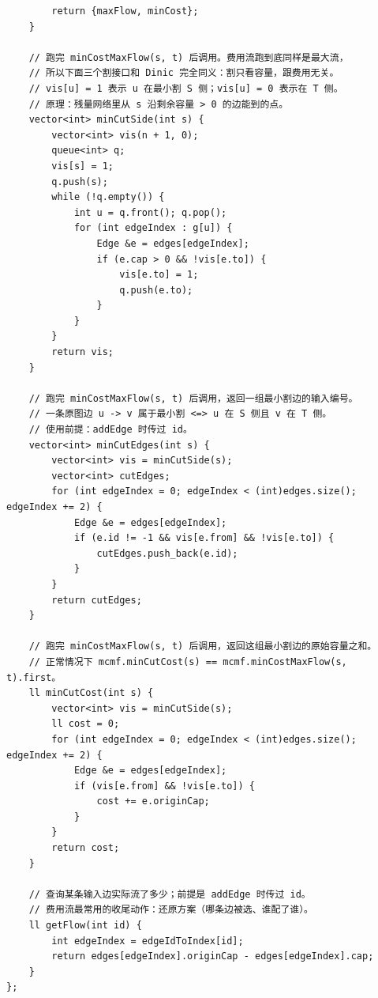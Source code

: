 \begin{verbatim}
        return {maxFlow, minCost};
    }

    // 跑完 minCostMaxFlow(s, t) 后调用。费用流跑到底同样是最大流，
    // 所以下面三个割接口和 Dinic 完全同义：割只看容量，跟费用无关。
    // vis[u] = 1 表示 u 在最小割 S 侧；vis[u] = 0 表示在 T 侧。
    // 原理：残量网络里从 s 沿剩余容量 > 0 的边能到的点。
    vector<int> minCutSide(int s) {
        vector<int> vis(n + 1, 0);
        queue<int> q;
        vis[s] = 1;
        q.push(s);
        while (!q.empty()) {
            int u = q.front(); q.pop();
            for (int edgeIndex : g[u]) {
                Edge &e = edges[edgeIndex];
                if (e.cap > 0 && !vis[e.to]) {
                    vis[e.to] = 1;
                    q.push(e.to);
                }
            }
        }
        return vis;
    }

    // 跑完 minCostMaxFlow(s, t) 后调用，返回一组最小割边的输入编号。
    // 一条原图边 u -> v 属于最小割 <=> u 在 S 侧且 v 在 T 侧。
    // 使用前提：addEdge 时传过 id。
    vector<int> minCutEdges(int s) {
        vector<int> vis = minCutSide(s);
        vector<int> cutEdges;
        for (int edgeIndex = 0; edgeIndex < (int)edges.size(); edgeIndex += 2) {
            Edge &e = edges[edgeIndex];
            if (e.id != -1 && vis[e.from] && !vis[e.to]) {
                cutEdges.push_back(e.id);
            }
        }
        return cutEdges;
    }

    // 跑完 minCostMaxFlow(s, t) 后调用，返回这组最小割边的原始容量之和。
    // 正常情况下 mcmf.minCutCost(s) == mcmf.minCostMaxFlow(s, t).first。
    ll minCutCost(int s) {
        vector<int> vis = minCutSide(s);
        ll cost = 0;
        for (int edgeIndex = 0; edgeIndex < (int)edges.size(); edgeIndex += 2) {
            Edge &e = edges[edgeIndex];
            if (vis[e.from] && !vis[e.to]) {
                cost += e.originCap;
            }
        }
        return cost;
    }

    // 查询某条输入边实际流了多少；前提是 addEdge 时传过 id。
    // 费用流最常用的收尾动作：还原方案（哪条边被选、谁配了谁）。
    ll getFlow(int id) {
        int edgeIndex = edgeIdToIndex[id];
        return edges[edgeIndex].originCap - edges[edgeIndex].cap;
    }
};
\end{verbatim}

